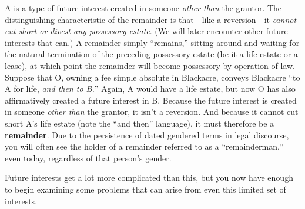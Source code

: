A  is a type of future interest created in someone
\textit{other than} the grantor. The distinguishing characteristic of the
remainder is that---like a reversion---it \textit{cannot cut short or divest
any possessory estate}. (We will later encounter other future
interests that can.) A remainder simply ``remains,'' sitting around and waiting
for the natural termination of the preceding possessory estate (be it a life
estate or a lease), at which point the remainder will become possessory by
operation of law. Suppose that O, owning a fee simple absolute in Blackacre,
conveys Blackacre ``to A for life, \textit{and then to B.}'' Again, A would
have a life estate, but now O has also affirmatively created a future interest
in B. Because the future interest is created in someone \textit{other than} the
grantor, it isn't a reversion. And because it cannot cut short A's life estate
(note the ``and then'' language), it must therefore be a
\textbf{remainder}. Due to the persistence of dated gendered terms in
legal discourse, you will often see the holder of a remainder referred to as a
``remainderman,'' even today, regardless of that person's gender.

Future interests get a lot more complicated than this, but you now have enough
to begin examining some problems that can arise from even this limited set of
interests.

